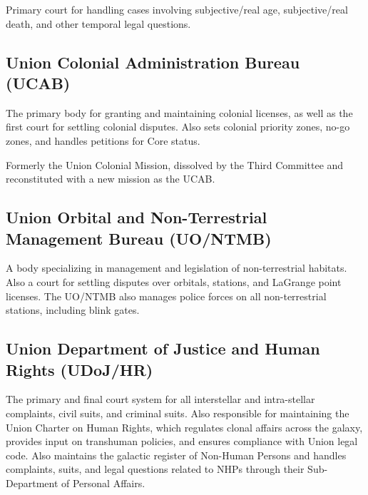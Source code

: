 Primary court for handling cases involving subjective/real age, subjective/real death, and other
temporal legal questions.

\subsection{Union Colonial Administration Bureau (UCAB)}

The primary body for granting and maintaining colonial licenses, as well as the first court for
settling colonial disputes. Also sets colonial priority zones, no-go zones, and handles petitions
for Core status.

Formerly the Union Colonial Mission, dissolved by the Third Committee and reconstituted with a
new mission as the UCAB.

\subsection{Union Orbital and Non-Terrestrial Management Bureau (UO/NTMB) }

A body specializing in management and legislation of non-terrestrial habitats. Also a court for
settling disputes over orbitals, stations, and LaGrange point licenses. The UO/NTMB also
manages police forces on all non-terrestrial stations, including blink gates.

\subsection{Union Department of Justice and Human Rights (UDoJ/HR)}

The primary and final court system for all interstellar and intra-stellar complaints, civil suits, and
criminal suits. Also responsible for maintaining the Union Charter on Human Rights, which
regulates clonal affairs across the galaxy, provides input on transhuman policies, and ensures
compliance with Union legal code. Also maintains the galactic register of Non-Human Persons
and handles complaints, suits, and legal questions related to NHPs through their Sub-
Department of Personal Affairs.
